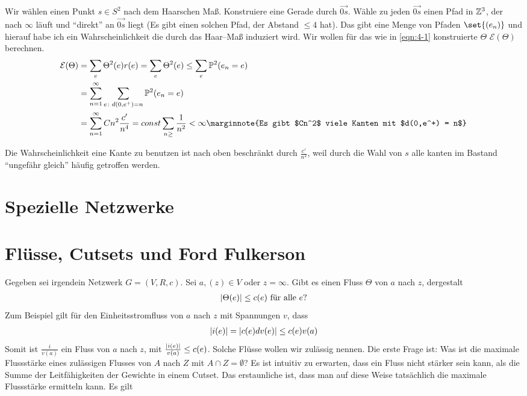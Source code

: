 \begin{beweis}
	Wir wählen einen Punkt $s \in S^2$ nach dem Haarschen Maß. Konstruiere eine Gerade durch $\overrightarrow{0s}$. Wähle zu jeden $\overrightarrow{0s}$ einen Pfad in $\mathbb{Z}^3$, der nach $\infty$ läuft und \enquote{direkt} an $\overrightarrow{0s}$ liegt (Es gibt einen solchen Pfad, der Abstand $\leq 4$ hat). 
	Das gibt eine Menge von Pfaden $\set{(e_n)}$ und hierauf habe ich ein Wahrscheinlichkeit die durch das Haar--Maß induziert wird. Wir wollen für das wie in \eqref{eqn:4-1} konstruierte $\Theta$ $\mathcal{E}(\Theta)$ berechnen.
	\begin{align}
		\mathcal{E}(\Theta) &= \sum\limits_{e} \Theta^2(e) r(e) = \sum\limits_{e}\Theta^2(e) \leq \sum\limits_{e} \prop{e_n=e}[2] \\
							&= \sum\limits_{n=1}^{\infty} \sum\limits_{e\colon d(0,e^+) = n}\prop{e_n = e}[2] \\
							&= \sum\limits_{n = 1}^{\infty}Cn^2\frac{c'}{n^4} = const \sum\limits_{n \geq} \frac{1}{n^2} < \infty \marginnote{Es gibt $Cn^2$ viele Kanten mit $d(0,e^+) = n$} 
	\end{align}
	
	Die Wahrscheinlichkeit eine Kante zu benutzen ist nach oben beschränkt durch $\frac{c'}{n^2}$, weil durch die Wahl von $s$ alle kanten im Bastand \enquote{ungefähr gleich} häufig getroffen werden.
	
\end{beweis}

\section*{Spezielle Netzwerke}
\label{chap:SpezielleNetzwerke}
\section{Flüsse, Cutsets und Ford Fulkerson}
Gegeben sei irgendein Netzwerk $G = (V,R,c).$ Sei $a,(z) \in V$ oder $z = \infty$. Gibt es einen Fluss $\Theta$ von $a$ nach $z$, dergestalt
\begin{gather}
	\lvert\Theta(e)\rvert \leq c(e)  \text{ für alle } e?
\end{gather}
Zum Beispiel gilt für den Einheitsstromfluss von $a$ nach $z$ mit Spannungen $v$, dass 
\begin{align}
	\lvert i(e)\rvert = \lvert c(e) dv(e)\rvert \leq c(e)v(a)
\end{align}
Somit ist $\frac{i}{v(a)}$ ein Fluss von $a$ nach $z$, mit $\frac{\lvert i(e)\rvert}{v(a)} \leq c(e)$. Solche Flüsse wollen wir zulässig nennen.
Die erste Frage ist: Was ist die maximale Flussstärke eines zulässigen Flusses von $A$ nach $Z$ mit $A \cap Z = \emptyset$?
Es ist intuitiv zu erwarten, dass ein Fluss nicht stärker sein kann, als die Summe der Leitfähigkeiten der Gewichte in einem Cutset.  Das erstaunliche ist, dass man auf diese Weise tatsächlich die maximale Flussstärke ermitteln kann. Es gilt

